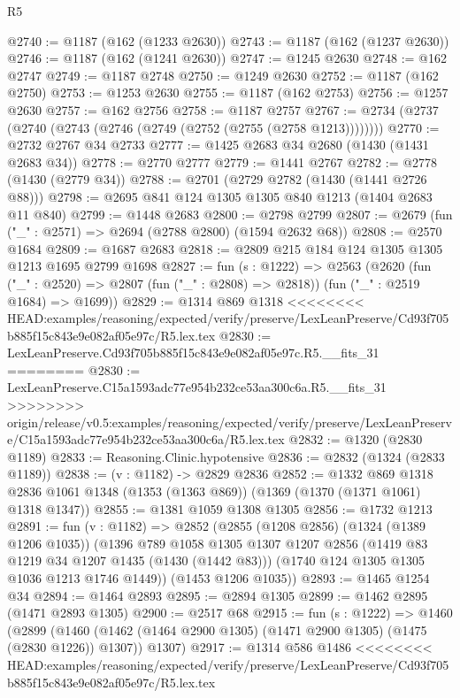 \begin{lexlean}{R5}
\begin{coremodule}
{{{{{{{{{{{{{{{{{{{{{{{{{{{{{{{{{{{{{{{{{{{{{{{{{{{{{{{{{{{{{{{{{{{{{{{{{{{{{{{{{{{{@2740 := @1187 (@162 (@1233 @2630))
@2743 := @1187 (@162 (@1237 @2630))
@2746 := @1187 (@162 (@1241 @2630))
@2747 := @1245 @2630
@2748 := @162 @2747
@2749 := @1187 @2748
@2750 := @1249 @2630
@2752 := @1187 (@162 @2750)
@2753 := @1253 @2630
@2755 := @1187 (@162 @2753)
@2756 := @1257 @2630
@2757 := @162 @2756
@2758 := @1187 @2757
@2767 := @2734 (@2737 (@2740 (@2743 (@2746 (@2749 (@2752 (@2755 (@2758 @1213))))))))
@2770 := @2732 @2767 @34 @2733
@2777 := @1425 @2683 @34 @2680 (@1430 (@1431 @2683 @34))
@2778 := @2770 @2777
@2779 := @1441 @2767
@2782 := @2778 (@1430 (@2779 @34))
@2788 := @2701 (@2729 @2782 (@1430 (@1441 @2726 @88)))
@2798 := @2695 @841 @124 @1305 @1305 @840 @1213 (@1404 @2683 @11 @840)
@2799 := @1448 @2683
@2800 := @2798 @2799
@2807 := @2679 (fun ("_" : @2571) => @2694 (@2788 @2800) (@1594 @2632 @68))
@2808 := @2570 @1684
@2809 := @1687 @2683
@2818 := @2809 @215 @184 @124 @1305 @1305 @1213 @1695 @2799 @1698
@2827 := fun (s : @1222) =>
  @2563
    (@2620
      (fun ("_" : @2520) => @2807 (fun ("_" : @2808) => @2818))
      (fun ("_" : @2519 @1684) => @1699))
@2829 := @1314 @869 @1318
<<<<<<<< HEAD:examples/reasoning/expected/verify/preserve/LexLeanPreserve/Cd93f705b885f15c843e9e082af05e97c/R5.lex.tex
@2830 := LexLeanPreserve.Cd93f705b885f15c843e9e082af05e97c.R5.__fits_31
========
@2830 := LexLeanPreserve.C15a1593adc77e954b232ce53aa300c6a.R5.__fits_31
>>>>>>>> origin/release/v0.5:examples/reasoning/expected/verify/preserve/LexLeanPreserve/C15a1593adc77e954b232ce53aa300c6a/R5.lex.tex
@2832 := @1320 (@2830 @1189)
@2833 := Reasoning.Clinic.hypotensive
@2836 := @2832 (@1324 (@2833 @1189))
@2838 := (v : @1182) -> @2829 @2836
@2852 := @1332
    @869
    @1318
    @2836
    @1061
    @1348
    (@1353 (@1363 @869))
    (@1369 (@1370 (@1371 @1061) @1318 @1347))
@2855 := @1381 @1059 @1308 @1305
@2856 := @1732 @1213
@2891 := fun (v : @1182) =>
  @2852
    (@2855
      (@1208 @2856)
      (@1324 (@1389 @1206 @1035))
      (@1396
        @789
        @1058
        @1305
        @1307
        @1207
        @2856
        (@1419 @83 @1219 @34 @1207 @1435 (@1430 (@1442 @83)))
        (@1740 @124 @1305 @1305 @1036 @1213 @1746 @1449))
      (@1453 @1206 @1035))
@2893 := @1465 @1254 @34
@2894 := @1464 @2893
@2895 := @2894 @1305
@2899 := @1462 @2895 (@1471 @2893 @1305)
@2900 := @2517 @68
@2915 := fun (s : @1222) =>
  @1460
    (@2899
      (@1460 (@1462 (@1464 @2900 @1305) (@1471 @2900 @1305) (@1475 (@2830 @1226)) @1307))
      @1307)
@2917 := @1314 @586 @1486
<<<<<<<< HEAD:examples/reasoning/expected/verify/preserve/LexLeanPreserve/Cd93f705b885f15c843e9e082af05e97c/R5.lex.tex
}}}}}}}}}}}}}}}}}}}}}}}}}}}}}}}}}}}}}}}}}}}}}}}}}}}}}}}}}}}}}}}}}}}}}}}}}}}}}}}}}}}}
\end{coremodule}
\end{lexlean}
